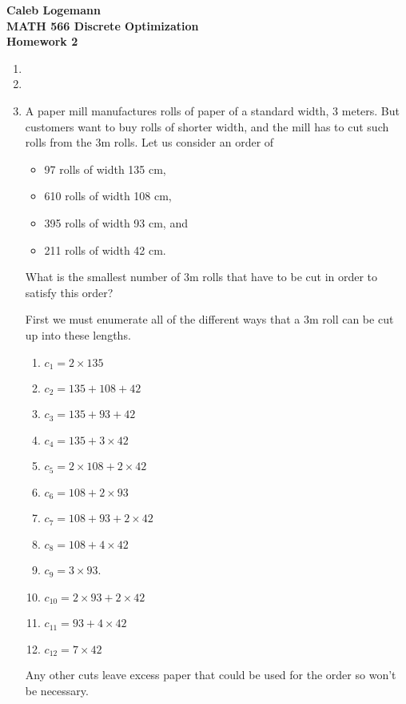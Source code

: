 \documentclass[11pt, oneside]{article}
\begin{document}
\noindent \textbf{\Large{Caleb Logemann \\
MATH 566 Discrete Optimization\\
Homework 2
}}

%
\begin{enumerate}
    \item %

    \item %

    \item %
        A paper mill manufactures rolls of paper of a standard width, 3 meters.
        But customers want to buy rolls of shorter width, and the mill has to
        cut such rolls from the 3m rolls.
        Let us consider an order of
        \begin{itemize}
            \item 97 rolls of width 135 cm,
            \item 610 rolls of width 108 cm,
            \item 395 rolls of width 93 cm, and
            \item 211 rolls of width 42 cm.
        \end{itemize}
        What is the smallest number of 3m rolls that have to be cut in order to
        satisfy this order?

        First we must enumerate all of the different ways that a 3m roll can be
        cut up into these lengths.
        \begin{enumerate}
            \item $c_1 = 2 \times 135$
            \item $c_2 = 135 + 108 + 42$
            \item $c_3 = 135 + 93 + 42$
            \item $c_4 = 135 + 3 \times 42$
            \item $c_5 = 2 \times 108 + 2 \times 42$
            \item $c_6 = 108 + 2 \times 93$
            \item $c_7 = 108 + 93 + 2 \times 42$
            \item $c_8 = 108 + 4 \times 42$
            \item $c_9 = 3 \times 93$.
            \item $c_{10} = 2 \times 93 + 2 \times 42$
            \item $c_{11} = 93 + 4 \times 42$
            \item $c_{12} = 7 \times 42$
        \end{enumerate}
        Any other cuts leave excess paper that could be used for the order so
        won't be necessary.


\end{enumerate}
\end{document}
